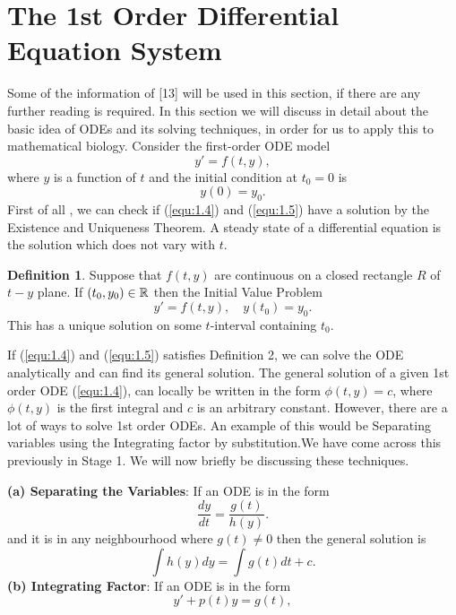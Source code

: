 \documentclass[a4paper]{report}
\theoremstyle{definition}
\newtheorem{defn}[thm]{Definition}
\begin{document}
\section{The 1st Order Differential Equation System}
Some of the information of [13] will be used in this section, if there are any further reading is required.
In this section we will discuss in detail about the basic idea of ODEs and its solving techniques, in order for us to apply this to mathematical biology.
Consider the first-order ODE model
\begin{equation}
\label{equ:1.4}
y'=f(t,y),
\end{equation}
where $y$ is a function of $t$ and the initial condition at $t_0=0$ is 
\begin{equation}
\label{equ:1.5}
y(0)=y_0.
\end{equation}
First of all , we can check if (\ref{equ:1.4}) and (\ref{equ:1.5}) have a solution by the Existence and Uniqueness Theorem.
A steady state of a differential equation is the solution which does not vary with $t$.
\\
\begin{mdframed}[backgroundcolor=airforceblue!25] 
\begin{defn} \label{def1}
Suppose that $f(t,y)$ are continuous on a closed rectangle $R$ of $t-y$ plane. If $(t_0,y_0)\in{\Bbb R}$ then the Initial Value Problem
$$y'=f(t,y) , \quad y(t_0)=y_0.$$
This has a unique solution on some $t$-interval containing $t_0$.
\end{defn}
\end{mdframed}
If (\ref{equ:1.4}) and (\ref{equ:1.5}) satisfies Definition 2, we can solve the ODE analytically and can find its general solution. The general solution of a given 1st order ODE (\ref{equ:1.4}), can locally be written  in the form $\phi(t,y)=c$, where $\phi(t,y)$ is the first integral and $c$ is an arbitrary constant. 
However, there are a lot of ways to solve 1st order ODEs. An example of this would be Separating variables using the Integrating factor by substitution.We have come across this previously in Stage 1. We will now briefly be discussing these techniques.

\textbf{(a) Separating the Variables}: If an ODE is in the form
\begin{equation}
\label{equ:1.6}
\dfrac{dy}{dt}=\dfrac{g(t)}{h(y)}.
 \end{equation}
and it is in any neighbourhood where $g(t) \neq 0$ then the general solution is 
\begin{equation}
\label{equ:1.7}
\int h(y) dy= \int g(t) dt +c.
\end{equation}
\textbf{(b) Integrating Factor}: If an ODE is in the form
\begin{equation}
\label{equ:1.8}
y'+p(t)y = g(t),
\end{equation}
\end{document}
